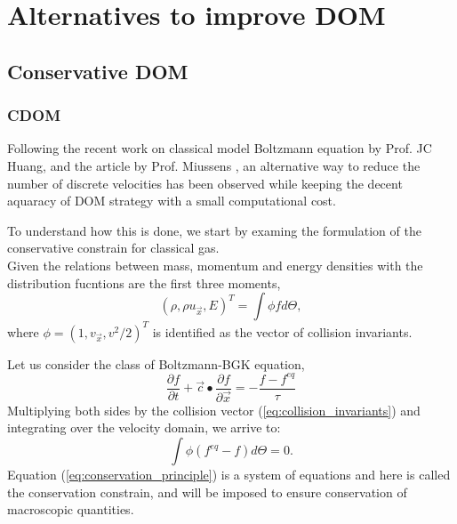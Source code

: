 \section{Alternatives to improve DOM}
\subsection{Conservative DOM}

\begin{frame}
	\frametitle{CDOM}
	Following the recent work on classical model Boltzmann equation by Prof. JC Huang, \cite{Huang2011261} and the article by Prof. Miussens \cite{Mieussens:2000:DMN:351065.351073}, an alternative way to reduce the number of discrete velocities has been observed while keeping the decent aquaracy of DOM strategy with a small computational cost.
\end{frame}
	
\begin{frame}
	To understand how this is done, we start by examing the formulation of the conservative constrain for classical gas. \\ 
	Given the relations between mass, momentum and energy densities with the distribution fucntions are the first three moments,
	\begin{equation}
		\left( \rho, \rho u_{\vec{x}}, E \right)^{T} = \int \phi f d\Theta,
	\label{eq:collision_invariants}
	\end{equation}
	where $\phi=(1,v_{\vec{x}},v^2/2)^{T}$ is identified as the vector of collision invariants. \\
\end{frame}

\begin{frame}
	Let us consider the class of Boltzmann-BGK equation,
	\begin{equation}
		\frac{\partial f}{\partial t} + \vec{c} \bullet \frac{\partial f}{\partial \vec{x}} = -\frac{f - f^{eq}}{\tau}
	\label{eq:kinetic_boltzmann_BGK}
	\end{equation}
	Multiplying both sides by the collision vector (\ref{eq:collision_invariants}) and integrating over the velocity domain, we arrive to:
	\begin{equation}
		\int \phi(f^{eq}-f)d\Theta = 0.
	\label{eq:conservation_principle}
	\end{equation}
	Equation (\ref{eq:conservation_principle}) is a system of equations and here is called the conservation constrain, and will be imposed to ensure conservation of macroscopic quantities.
\end{frame}

